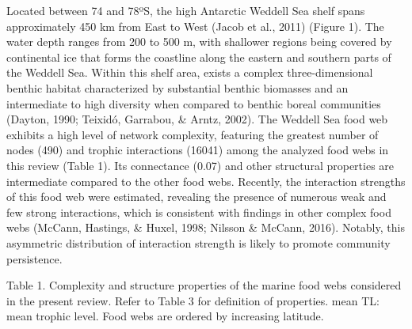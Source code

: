 \documentclass[
]{article}
\begin{document}
Located between 74 and 78ºS, the high Antarctic Weddell Sea shelf spans
approximately 450 km from East to West (Jacob et al., 2011) (Figure 1).
The water depth ranges from 200 to 500 m, with shallower regions being
covered by continental ice that forms the coastline along the eastern
and southern parts of the Weddell Sea. Within this shelf area, exists a
complex three-dimensional benthic habitat characterized by substantial
benthic biomasses and an intermediate to high diversity when compared to
benthic boreal communities (Dayton, 1990; Teixidó, Garrabou, \& Arntz,
2002). The Weddell Sea food web exhibits a high level of network
complexity, featuring the greatest number of nodes (490) and trophic
interactions (16041) among the analyzed food webs in this review (Table
1). Its connectance (0.07) and other structural properties are
intermediate compared to the other food webs. Recently, the interaction
strengths of this food web were estimated, revealing the presence of
numerous weak and few strong interactions, which is consistent with
findings in other complex food webs (McCann, Hastings, \& Huxel, 1998;
Nilsson \& McCann, 2016). Notably, this asymmetric distribution of
interaction strength is likely to promote community persistence.

\footnotesize

Table 1. Complexity and structure properties of the marine food webs
considered in the present review. Refer to Table 3 for definition of
properties. mean TL: mean trophic level. Food webs are ordered by
increasing latitude.
\end{document}
